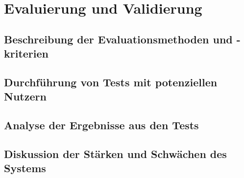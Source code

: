 \section{Evaluierung und Validierung}

\subsection{Beschreibung der Evaluationsmethoden und -kriterien}

\subsection{Durchführung von Tests mit potenziellen Nutzern}

\subsection{Analyse der Ergebnisse aus den Tests}

\subsection{Diskussion der Stärken und Schwächen des Systems}